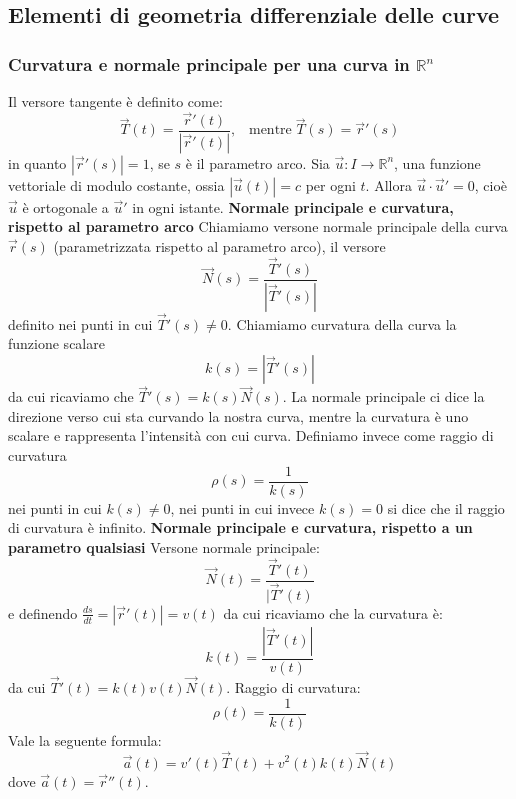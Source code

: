 \subsection{Elementi di geometria differenziale delle curve}
\subsubsection{Curvatura e normale principale per una curva in $\mathbb{R}^n$}
Il versore tangente è definito come:
\[
    \vec{T}(t) = \frac{\vec{r}'(t)}{|\vec{r}'(t)|}\text{,} \quad \text{mentre} \;\vec{T}(s) =\vec{r}'(s)
\]
in quanto $|\vec{r}'(s)| = 1$, se $s$ è il parametro arco.\newline
Sia $\vec{u}: I \rightarrow \mathbb{R}^n$, una funzione vettoriale di modulo costante, ossia $|\vec{u}(t)| = c$ per ogni $t$. Allora $\vec{u} \cdot \vec{u}' = 0$, cioè $\vec{u}$ è ortogonale a $\vec{u}'$ in ogni istante.\newline
\newline
\textbf{Normale principale e curvatura, rispetto al parametro arco}\newline
Chiamiamo versone normale principale della curva $\vec{r}(s)$ (parametrizzata rispetto al parametro arco), il versore
\[
    \vec{N}(s) =\frac{\vec{T}'(s)}{|\vec{T}'(s)|}
\]
definito nei punti in cui $\vec{T}'(s) \neq 0$.\newline
Chiamiamo curvatura della curva la funzione scalare
\[
    k(s) = |\vec{T}'(s)|
\]
da cui ricaviamo che $\vec{T}'(s) = k(s) \vec{N}(s)$. \newline
La normale principale ci dice la direzione verso cui sta curvando la nostra curva, mentre la curvatura è uno scalare e rappresenta l'intensità con cui curva.\newline
Definiamo invece come raggio di curvatura
\[
    \rho(s) = \frac{1}{k(s)}
\]
nei punti in cui $k(s) \neq 0$, nei punti in cui invece $k(s) = 0$ si dice che il raggio di curvatura è infinito.\newline
\newline
\newline
\textbf{Normale principale e curvatura, rispetto a un parametro qualsiasi}\newline
Versone normale principale:
\[
    \vec{N}(t) =\frac{\vec{T}'(t)}{|\vec{T}'(t)}
\]
e definendo $\frac{ds}{dt} = |\vec{r}'(t)| = v(t)$ da cui ricaviamo che la curvatura è:
\[
    k(t) = \frac{|\vec{T}'(t)|}{v(t)}
\]
da cui $\vec{T}'(t) = k(t)v(t)\vec{N}(t)$.\newline
Raggio di curvatura:
\[
    \rho(t)= \frac{1}{k(t)}
\]
\newline
Vale la seguente formula:
\[
    \vec{a}(t) = v'(t)\vec{T}(t) + v^2(t) k(t) \vec{N}(t)
\]
dove $\vec{a}(t) = \vec{r}''(t)$.
